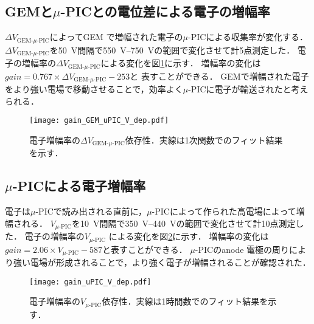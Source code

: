 \documentclass[../master]{subfiles}
\begin{document}

\subsection{GEMと$\mu$-PICとの電位差による電子の増幅率}
$\Delta V_{\text{GEM-}\mu\text{-PIC}}$によってGEM で増幅された電子の$\mu$-PICによる収集率が変化する．
$\Delta V_{\text{GEM-}\mu\text{-PIC}}$を\SI{50}{\volt}間隔で\SIrange{550}{750}{\volt}の範囲で変化させて計5点測定した．
電子の増幅率の$\Delta V_{\text{GEM-}\mu\text{-PIC}}$による変化を図\ref{fig::gain_GEM_uPIC_V_dep}に示す．
増幅率の変化は$\mathit{gain} = 0.767\times{\Delta V_{\text{GEM-}\mu\text{-PIC}}}-253$と
表すことができる．
GEMで増幅された電子をより強い電場で移動させることで，効率よく$\mu$-PICに電子が輸送されたと考えられる．
\begin{figure}
  \centering
  \texttt{[image: gain\_GEM\_uPIC\_V\_dep.pdf]}
  \caption{電子増幅率の$\Delta V_{\text{GEM-}\mu\text{-PIC}}$依存性．実線は1次関数でのフィット結果を示す．}
  \label{fig::gain_GEM_uPIC_V_dep}
\end{figure}

\subsection{$\mu$-PICによる電子増幅率}
電子は$\mu$-PICで読み出される直前に，$\mu$-PICによって作られた高電場によって増幅される．
$V_{\mu\text{-PIC}}$を\SI{10}{\volt}間隔で\SIrange{350}{440}{\volt}の範囲で変化させて計10点測定した．
電子の増幅率の$V_{\mu\text{-PIC}}$ による変化を図\ref{fig::gain_uPIC_V_dep}に示す．
増幅率の変化は$\mathit{gain} = 2.06\times{V_{\mu\text{-PIC}}}-587$と表すことができる．
$\mu$-PICのanode 電極の周りにより強い電場が形成されることで，より強く電子が増幅されることが確認された．
\begin{figure}
  \centering
  \texttt{[image: gain\_uPIC\_V\_dep.pdf]}
  \caption{電子増幅率の$V_{\mu\text{-PIC}}$依存性．実線は1時間数でのフィット結果を示す．}
  \label{fig::gain_uPIC_V_dep}
\end{figure}
\end{document}
